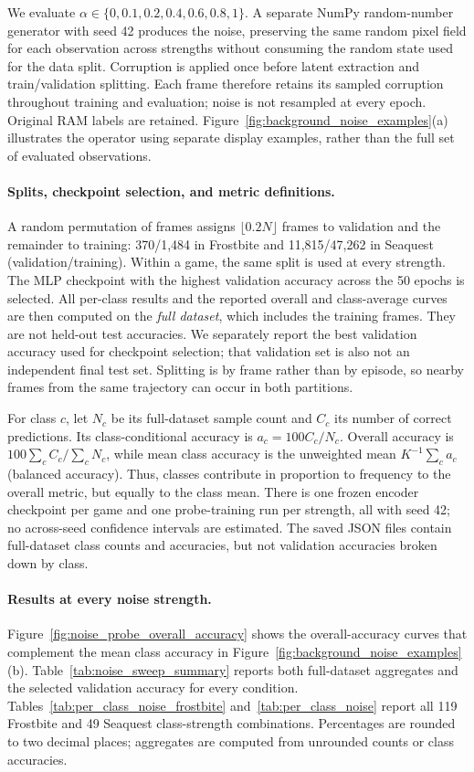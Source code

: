\documentclass{article} %
\begin{document}
We evaluate $\alpha\in\{0,0.1,0.2,0.4,0.6,0.8,1\}$. A separate NumPy random-number generator with seed 42 produces the noise, preserving the same random pixel field for each observation across strengths without consuming the random state used for the data split. Corruption is applied once before latent extraction and train/validation splitting. Each frame therefore retains its sampled corruption throughout training and evaluation; noise is not resampled at every epoch. Original RAM labels are retained. Figure~\ref{fig:background_noise_examples}(a) illustrates the operator using separate display examples, rather than the full set of evaluated observations.

\paragraph{Splits, checkpoint selection, and metric definitions.}
A random permutation of frames assigns $\lfloor0.2N\rfloor$ frames to validation and the remainder to training: 370/1,484 in Frostbite and 11,815/47,262 in Seaquest (validation/training). Within a game, the same split is used at every strength. The MLP checkpoint with the highest validation accuracy across the 50 epochs is selected. All per-class results and the reported overall and class-average curves are then computed on the \emph{full dataset}, which includes the training frames. They are not held-out test accuracies. We separately report the best validation accuracy used for checkpoint selection; that validation set is also not an independent final test set. Splitting is by frame rather than by episode, so nearby frames from the same trajectory can occur in both partitions.

For class $c$, let $N_c$ be its full-dataset sample count and $C_c$ its number of correct predictions. Its class-conditional accuracy is $a_c=100C_c/N_c$. Overall accuracy is $100\sum_c C_c/\sum_c N_c$, while mean class accuracy is the unweighted mean $K^{-1}\sum_c a_c$ (balanced accuracy). Thus, classes contribute in proportion to frequency to the overall metric, but equally to the class mean. There is one frozen encoder checkpoint per game and one probe-training run per strength, all with seed 42; no across-seed confidence intervals are estimated. The saved JSON files contain full-dataset class counts and accuracies, but not validation accuracies broken down by class.

\paragraph{Results at every noise strength.}
Figure~\ref{fig:noise_probe_overall_accuracy} shows the overall-accuracy curves that complement the mean class accuracy in Figure~\ref{fig:background_noise_examples}(b). Table~\ref{tab:noise_sweep_summary} reports both full-dataset aggregates and the selected validation accuracy for every condition. Tables~\ref{tab:per_class_noise_frostbite} and~\ref{tab:per_class_noise} report all 119 Frostbite and 49 Seaquest class-strength combinations. Percentages are rounded to two decimal places; aggregates are computed from unrounded counts or class accuracies.
\end{document}

